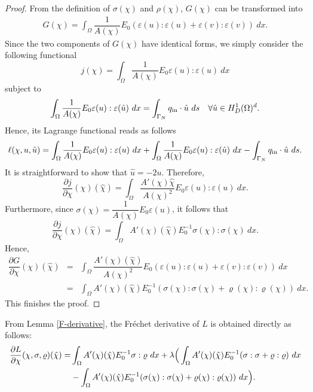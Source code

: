 \documentclass{amsart}
\begin{document}
\begin{proof}
    From the definition of $\sigma(\chi)$ and $\rho(\chi)$, $G(\chi)$ can be transformed into
    \begin{eqnarray}
    G(\chi)=\int_{\Omega}\dfrac{1}{A(\chi)}{E}_0(\varepsilon(u):\varepsilon(u)+\varepsilon(v):\varepsilon(v))\ dx.\label{G_rep}    
    \end{eqnarray}
    Since the two components of $ G(\chi) $ have identical forms, we simply consider the following functional
    $$j(\chi) = \int_{\Omega}\dfrac{1}{A(\chi)}{E}_0\varepsilon(u):\varepsilon(u)\ dx$$
    subject to
    $$ \int_{\Omega}\dfrac{1}{A(\chi)}{E}_0\varepsilon(u):\varepsilon(\hat{u})\ dx=\int_{\Gamma_N}q_{\rm in}\cdot\hat{u}\ ds\quad \forall \hat{u}\in H_D^1(\Omega)^d.$$
    Hence, its Lagrange functional reads as follows
    $$\ell(\chi,u,\hat{u})=\int_{\Omega}\dfrac{1}{A(\chi)}{E}_0\varepsilon(u):\varepsilon(u)\ dx+\int_{\Omega}\dfrac{1}{A(\chi)}{E}_0\varepsilon(u):\varepsilon(\hat{u})\ dx-\int_{\Gamma_N}q_{\rm in}\cdot\hat{u}\ ds.$$
    It is straightforward to show that $\hat u=-2u$. Therefore, 
    $$\dfrac{\partial j}{\partial \chi}(\chi)(\hat{\chi})=\int_{\Omega}\dfrac{A'(\chi)\hat{\chi}}{A(\chi)^2}E_0\varepsilon(u):\varepsilon(u)\ dx.$$
    Furthermore, since $\sigma(\chi)=\dfrac{1}{A(\chi)}{E}_0\varepsilon(u)$, it follows that
    $$\dfrac{\partial j}{\partial \chi}(\chi)(\hat{\chi})=\int_{\Omega}A'(\chi)(\hat{\chi}){E}_0^{-1}\sigma(\chi):\sigma(\chi)\ dx.$$
    Hence,
    \begin{eqnarray}
    \dfrac{\partial G}{\partial \chi}(\chi)(\hat{\chi})&=&\int_{\Omega}\dfrac{A'(\chi)(\hat{\chi})}{A(\chi)^2}{E}_0(\varepsilon(u):\varepsilon(u)+\varepsilon(v):\varepsilon(v))\ dx\nonumber\\
    &=&\int_{\Omega}A'(\chi)(\hat{\chi}){E}_0^{-1}(\sigma(\chi):\sigma(\chi)+\varrho(\chi):\varrho(\chi))\ dx.\nonumber
    \end{eqnarray} 
    This finishes the proof.
\end{proof}

From Lemma \ref{F-derivative}, the Fréchet derivative of $ L $ is obtained directly as follows:
\begin{align}
    \dfrac{\partial L}{\partial \chi}(\chi,\sigma,\varrho)(\hat{\chi}) =&\int_{\Omega}A'(\chi)(\hat{\chi}){E}_0^{-1}\sigma:\varrho\ dx +
    \lambda\Big(\int_{\Omega}A'(\chi)(\hat{\chi}){E}_0^{-1}(\sigma:\sigma+\varrho:\varrho)\ dx\notag\\
    &-\int_{\Omega}A'(\chi)(\hat{\chi}){E}_0^{-1}(\sigma(\chi):\sigma(\chi)+\varrho(\chi):\varrho(\chi))\ dx\Big).
\end{align}
    
\end{document}
